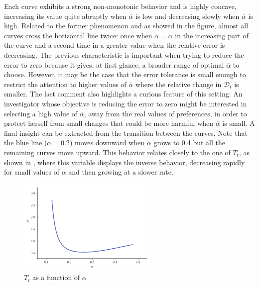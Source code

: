 \documentclass[english, a4paper, 12pt]{article}
\begin{document}
Each curve exhibits a strong non-monotonic behavior and is highly concave, increasing its value quite abruptly when $\overline{\alpha}$ is low and decreasing slowly when $\overline{\alpha}$ is high. Related to the former phenomenon and as showed in the figure, almost all curves cross the horizontal line twice: once when $\overline{\alpha} = \alpha$ in the increasing part of the curve and a second time in a greater value when the relative error is decreasing. The previous characteristic is important when trying to reduce the error to zero because it gives, at first glance, a broader range of optimal $\overline{\alpha}$ to choose. However, it may be the case that the error tolerance is small enough to restrict the attention to higher values of $\overline{\alpha}$ where the relative change in $\mathcal{D}_{t}$ is smaller. The last comment also highlights a curious feature of this setting: An investigator whose objective is reducing the error to zero might be interested in selecting a high value of $\overline{\alpha}$, away from the real values of preferences, in order to protect herself from small changes that could be more harmful when $\overline{\alpha}$ is small. A final insight can be extracted from the transition between the curves. Note that the blue line ($\alpha = 0.2$) moves downward when $\alpha$ grows to 0.4 but all the remaining curves move upward. This behavior relates closely to the one of $T_{t}$, as shown in , where this variable displays the inverse behavior, decreasing rapidly for small values of $\alpha$ and then growing at a slower rate. 
	\begin{figure}[H]
		\caption{$T_{t}$ as a function of $\alpha$}
		\label{fig:monotTt}
		\includegraphics[width = 0.6\textwidth]{MonotonocityTt}
		\vspace{-1ex}
	\end{figure}
\end{document}
